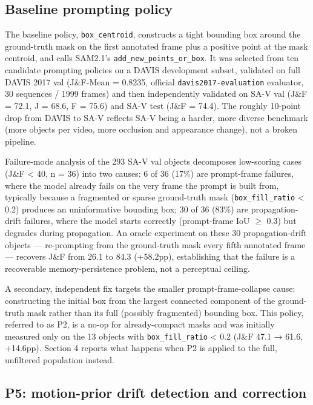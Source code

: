 \documentclass[11pt]{article}
\begin{document}
\subsection{Baseline prompting policy}

The baseline policy, \texttt{box\_centroid}, constructs a tight bounding box around the ground-truth mask on the first annotated frame plus a positive point at the mask centroid, and calls SAM2.1's \texttt{add\_new\_points\_or\_box}. It was selected from ten candidate prompting policies on a DAVIS development subset, validated on full DAVIS 2017 val (J\&F-Mean = 0.8235, official \texttt{davis2017-evaluation} evaluator, 30 sequences / 1999 frames) and then independently validated on SA-V val (J\&F = 72.1, J = 68.6, F = 75.6) and SA-V test (J\&F = 74.4). The roughly 10-point drop from DAVIS to SA-V reflects SA-V being a harder, more diverse benchmark (more objects per video, more occlusion and appearance change), not a broken pipeline.

Failure-mode analysis of the 293 SA-V val objects decomposes low-scoring cases (J\&F < 40, n = 36) into two causes: 6 of 36 (17\%) are prompt-frame failures, where the model already fails on the very frame the prompt is built from, typically because a fragmented or sparse ground-truth mask (\texttt{box\_fill\_ratio} < 0.2) produces an uninformative bounding box; 30 of 36 (83\%) are propagation-drift failures, where the model starts correctly (prompt-frame IoU $\geq$ 0.3) but degrades during propagation. An oracle experiment on these 30 propagation-drift objects — re-prompting from the ground-truth mask every fifth annotated frame — recovers J\&F from 26.1 to 84.3 (+58.2pp), establishing that the failure is a recoverable memory-persistence problem, not a perceptual ceiling.

A secondary, independent fix targets the smaller prompt-frame-collapse cause: constructing the initial box from the largest connected component of the ground-truth mask rather than its full (possibly fragmented) bounding box. This policy, referred to as P2, is a no-op for already-compact masks and was initially measured only on the 13 objects with \texttt{box\_fill\_ratio} < 0.2 (J\&F 47.1 → 61.6, +14.6pp). Section 4 reports what happens when P2 is applied to the full, unfiltered population instead.

\subsection{P5: motion-prior drift detection and correction}
\end{document}
